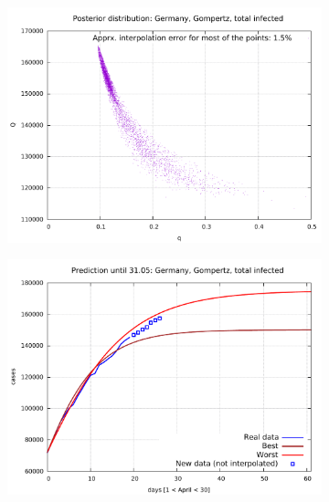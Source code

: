 \documentclass[8pt]{article}
\begin{document}
\begin{figure}[h!]
  \centering
  \begin{subfigure}[b]{0.5\linewidth}
  \includegraphics[width=\linewidth]{../de_g_t/posterior.pdf}
  \end{subfigure}
  \begin{subfigure}[b]{0.48\linewidth}
    \includegraphics[width=\linewidth]{../de_g_t/prediction.pdf}
  \end{subfigure}
  \begin{subfigure}[b]{0.48\linewidth}

\end{subfigure}
\end{figure}
\end{document}
